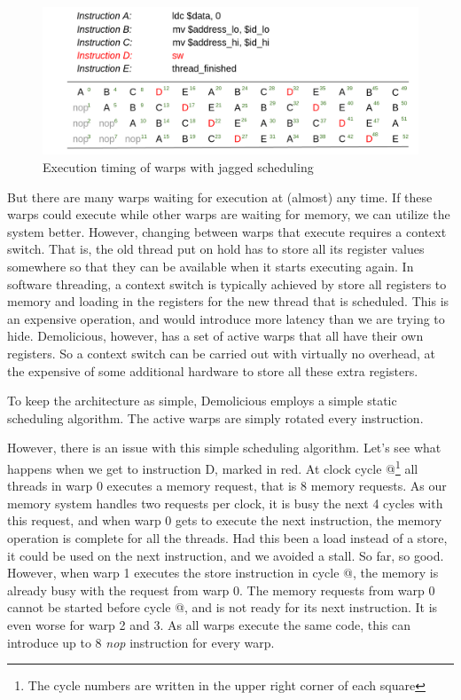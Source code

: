 \documentclass[../main/report.tex]{subfiles}
\begin{document}
\begin{figure}[htp]
\centering
\includegraphics[scale=0.40]{../gpu/diagrams/jaktstart_num.png}
\caption{Execution timing of warps with jagged scheduling}
\label{jagged}
\end{figure}

But there are many warps waiting for execution at (almost) any time. 
If these warps could execute while other warps are waiting for memory, we can utilize the system better.
However, changing between warps that execute requires a context switch. 
That is, the old thread put on hold has to store all its register values somewhere so that they can be available when it starts executing again.
In software threading, a context switch is typically achieved by store all registers to memory and loading in the registers for the new thread that is scheduled.
This is an expensive operation, and would introduce more latency than we are trying to hide.
Demolicious, however, has a set of active warps that all have their own registers.
So a context switch can be carried out with virtually no overhead, at the expensive of some additional hardware to store all these extra registers.

To keep the architecture as simple, Demolicious employs a simple static scheduling algorithm. 
The active warps are simply rotated every instruction.

However, there is an issue with this simple scheduling algorithm. Let's see what happens when we get to instruction D, marked in red. At clock cycle @\footnote{The cycle numbers are written in the upper right corner of each square} all threads in warp 0 executes a memory request, that is 8 memory requests. 
As our memory system handles two requests per clock, it is busy the next 4 cycles with this request, and when warp 0 gets to execute the next instruction, the memory operation is complete for all the threads.
Had this been a load instead of a store, it could be used on the next instruction, and we avoided a stall.
So far, so good.
However, when warp 1 executes the store instruction in cycle @, the memory is already busy with the request from warp 0.
The memory requests from warp 0 cannot be started before cycle @, and is not ready for its next instruction. 
It is even worse for warp 2 and 3. As all warps execute the same code, this can introduce up to 8 \emph{nop} instruction for every warp.
\end{document}
